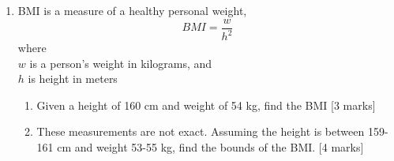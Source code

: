 \documentclass[12pt, twoside]{article}
\begin{document}
\begin{enumerate}
\newpage

  \item BMI is a measure of a healthy personal weight, 
  \[\displaystyle BMI = \frac{w}{h^2}\]
    where \\
    $w$ is a person's weight in kilograms, and \\
    $h$ is height in meters
    \begin{enumerate} 
        \item Given a height of 160 cm and weight of 54 kg, find the BMI  \hfill [3 marks]
        \item These measurements are not exact. Assuming the height is between 159-161 cm and weight 53-55 kg, find the bounds of the BMI.  \hfill [4 marks]
      \end{enumerate}


\end{enumerate}
\end{document}
